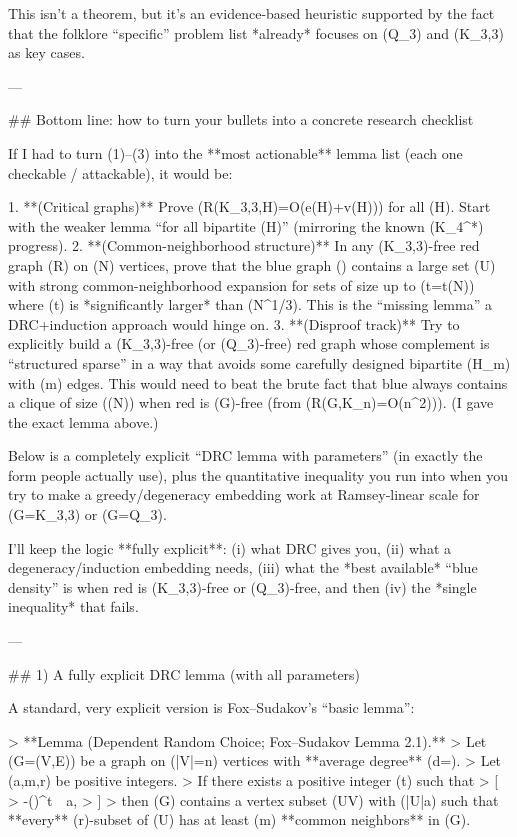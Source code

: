 This isn’t a theorem, but it’s an evidence-based heuristic supported by the fact that the folklore “specific” problem list *already* focuses on (Q_3) and (K_{3,3}) as key cases.

---

## Bottom line: how to turn your bullets into a concrete research checklist

If I had to turn (1)–(3) into the **most actionable** lemma list (each one checkable / attackable), it would be:

1. **(Critical graphs)** Prove (R(K_{3,3},H)=O(e(H)+v(H))) for all (H).
   Start with the weaker lemma “for all bipartite (H)” (mirroring the known (K_4^*) progress).
2. **(Common-neighborhood structure)** In any (K_{3,3})-free red graph (R) on (N) vertices, prove that the blue graph () contains a large set (U) with strong common-neighborhood expansion for sets of size up to (t=t(N)) where (t) is *significantly larger* than (N^{1/3}). This is the “missing lemma” a DRC+induction approach would hinge on.
3. **(Disproof track)** Try to explicitly build a (K_{3,3})-free (or (Q_3)-free) red graph whose complement is “structured sparse” in a way that avoids some carefully designed bipartite (H_m) with (m) edges. This would need to beat the brute fact that blue always contains a clique of size (\Omega(\sqrt N)) when red is (G)-free (from (R(G,K_n)=O(n^2))). (I gave the exact lemma above.)

Below is a completely explicit “DRC lemma with parameters” (in exactly the form people actually use), plus the quantitative inequality you run into when you try to make a greedy/degeneracy embedding work at Ramsey‑linear scale for (G=K_{3,3}) or (G=Q_3).

I’ll keep the logic **fully explicit**: (i) what DRC gives you, (ii) what a degeneracy/induction embedding needs, (iii) what the *best available* “blue density” is when red is (K_{3,3})-free or (Q_3)-free, and then (iv) the *single inequality* that fails.

---

## 1) A fully explicit DRC lemma (with all parameters)

A standard, very explicit version is Fox–Sudakov’s “basic lemma”:

> **Lemma (Dependent Random Choice; Fox–Sudakov Lemma 2.1).**
> Let (G=(V,E)) be a graph on (|V|=n) vertices with **average degree** (d=).
> Let (a,m,r) be positive integers.
> If there exists a positive integer (t) such that
> [
> -\left(\right)^{t}\ \ge\ a,
> ]
> then (G) contains a vertex subset (U\subseteq V) with (|U|\ge a) such that **every** (r)-subset of (U) has at least (m) **common neighbors** in (G).

